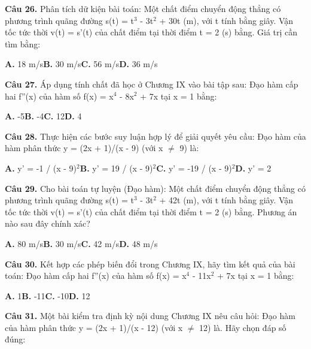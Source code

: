 \documentclass[11pt,a4paper]{article}
\begin{document}
\textbf{\color{primary} Câu 26.} Phân tích dữ kiện bài toán: Một chất điểm chuyển động thẳng có phương trình quãng đường s(t) = t$^3$ - 3t$^2$ + 30t (m), với t tính bằng giây. Vận tốc tức thời v(t) = s'(t) của chất điểm tại thời điểm t = 2 (s) bằng. Giá trị cần tìm bằng:\par
\hspace*{1.5em}\textbf{A.} 18 m/s\quad\quad \textbf{B.} 30 m/s\quad\quad \textbf{C.} 56 m/s\quad\quad \textbf{D.} 36 m/s\par\vspace{2pt}
\textbf{\color{primary} Câu 27.} Áp dụng tính chất đã học ở Chương IX vào bài tập sau: Đạo hàm cấp hai f''(x) của hàm số f(x) = x$^4$ - 8x$^2$ + 7x tại x = 1 bằng:\par
\hspace*{1.5em}\textbf{A.} -5\quad\quad \textbf{B.} -4\quad\quad \textbf{C.} 12\quad\quad \textbf{D.} 4\par\vspace{2pt}
\textbf{\color{primary} Câu 28.} Thực hiện các bước suy luận hợp lý để giải quyết yêu cầu: Đạo hàm của hàm phân thức y = (2x + 1)/(x - 9) (với x $\ne$ 9) là:\par
\hspace*{1.5em}\textbf{A.} y' = -1 / (x - 9)$^2$\quad\quad \textbf{B.} y' = 19 / (x - 9)$^2$\quad\quad \textbf{C.} y' = -19 / (x - 9)$^2$\quad\quad \textbf{D.} y' = 2\par\vspace{2pt}
\textbf{\color{primary} Câu 29.} Cho bài toán tự luyện (Đạo hàm): Một chất điểm chuyển động thẳng có phương trình quãng đường s(t) = t$^3$ - 3t$^2$ + 42t (m), với t tính bằng giây. Vận tốc tức thời v(t) = s'(t) của chất điểm tại thời điểm t = 2 (s) bằng. Phương án nào sau đây chính xác?\par
\hspace*{1.5em}\textbf{A.} 80 m/s\quad\quad \textbf{B.} 30 m/s\quad\quad \textbf{C.} 42 m/s\quad\quad \textbf{D.} 48 m/s\par\vspace{2pt}
\textbf{\color{primary} Câu 30.} Kết hợp các phép biến đổi trong Chương IX, hãy tìm kết quả của bài toán: Đạo hàm cấp hai f''(x) của hàm số f(x) = x$^4$ - 11x$^2$ + 7x tại x = 1 bằng:\par
\hspace*{1.5em}\textbf{A.} 1\quad\quad \textbf{B.} -11\quad\quad \textbf{C.} -10\quad\quad \textbf{D.} 12\par\vspace{2pt}
\textbf{\color{primary} Câu 31.} Một bài kiểm tra định kỳ nội dung Chương IX nêu câu hỏi: Đạo hàm của hàm phân thức y = (2x + 1)/(x - 12) (với x $\ne$ 12) là. Hãy chọn đáp số đúng:\par
\end{document}
